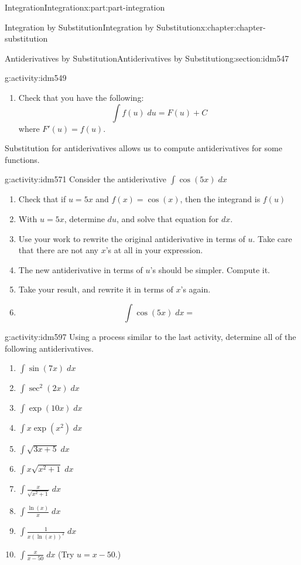 \documentclass[oneside,10pt,]{book}
\numberwithin{equation}{section}
\begin{document}
\begin{partptx}{Integration}{}{Integration}{}{}{x:part:part-integration}
\begin{chapterptx}{Integration by Substitution}{}{Integration by Substitution}{}{}{x:chapter:chapter-substitution}
\begin{sectionptx}{Antiderivatives by Substitution}{}{Antiderivatives by Substitution}{}{}{g:section:idm547}
\begin{activity}{}{g:activity:idm549}
\begin{enumerate}[font=\bfseries,label=(\alph*),ref=\alph*]
\item{}Check that you have the following:%
\begin{equation*}
\int f(u)\;du = F(u) + C
\end{equation*}
where \(F'(u) = f(u)\).%
\end{enumerate}
\end{activity}
Substitution for antiderivatives allows us to compute antiderivatives for some functions.%
\begin{activity}{}{g:activity:idm571}%
Consider the antiderivative \(\displaystyle \int \cos(5x)\;dx\)%
\begin{enumerate}[font=\bfseries,label=(\alph*),ref=\alph*]
\item{}Check that if \(u = 5x\) and \(f(x) = \cos(x)\), then the integrand is \(f(u)\)%
\item{}With \(u = 5x\), determine \(du\), and solve that equation for \(dx\).%
\item{}Use your work to rewrite the original antiderivative in terms of \(u\). Take care that there are not any \(x\)'s at all in your expression.%
\item{}The new antiderivative in terms of \(u\)'s should be simpler. Compute it.%
\item{}Take your result, and rewrite it in terms of \(x\)'s again.%
\item{}%
\begin{equation*}
\int \cos(5x)\;dx = 
\end{equation*}
\end{enumerate}
\end{activity}
\begin{activity}{}{g:activity:idm597}%
Using a process similar to the last activity, determine all of the following antiderivatives.%
\begin{enumerate}[font=\bfseries,label=(\alph*),ref=\alph*]
\item{}\(\displaystyle\int \sin(7x)\;dx\)\item{}\(\displaystyle\int \sec^2(2x)\;dx\)\item{}\(\displaystyle\int \exp(10x)\;dx\)\item{}\(\displaystyle\int x\exp(x^2)\;dx\)\item{}\(\displaystyle\int \sqrt{3x+5}\;dx\)\item{}\(\displaystyle\int x\sqrt{x^2+1}\;dx\)\item{}\(\displaystyle\int \frac{x}{\sqrt{x^2+1}}\;dx\)\item{}\(\displaystyle\int \frac{\ln(x)}{x}\;dx\)\item{}\(\displaystyle\int \frac{1}{x(\ln(x))^2}\;dx\)\item{}\(\displaystyle\int \frac{x}{x-50}\;dx\) (Try \(u=x-50\).)\end{enumerate}

\end{activity}
\end{sectionptx}
\end{chapterptx}
\end{partptx}
\end{document}
